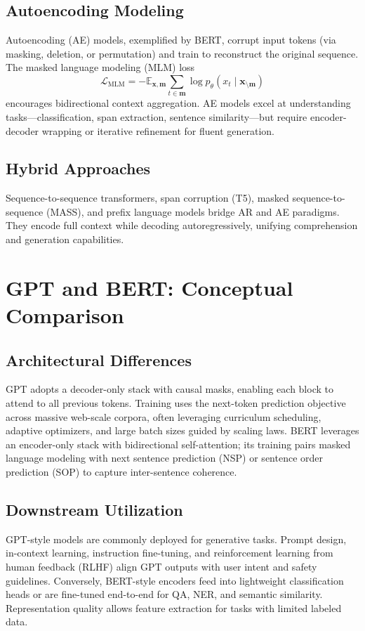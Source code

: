 \documentclass{article}
\begin{document}
\subsection{Autoencoding Modeling}
Autoencoding (AE) models, exemplified by BERT, corrupt input tokens (via masking, deletion, or permutation) and train to reconstruct the original sequence. The masked language modeling (MLM) loss
\begin{equation}
  \mathcal{L}_{\text{MLM}} = - \mathbb{E}_{\mathbf{x}, \mathbf{m}} \sum_{t \in \mathbf{m}} \log p_{\theta}(x_t \mid \mathbf{x}_{\setminus \mathbf{m}})
\end{equation}
encourages bidirectional context aggregation. AE models excel at understanding tasks—classification, span extraction, sentence similarity—but require encoder-decoder wrapping or iterative refinement for fluent generation.

\subsection{Hybrid Approaches}
Sequence-to-sequence transformers, span corruption (T5), masked sequence-to-sequence (MASS), and prefix language models bridge AR and AE paradigms. They encode full context while decoding autoregressively, unifying comprehension and generation capabilities.

\section{GPT and BERT: Conceptual Comparison}
\subsection{Architectural Differences}
GPT adopts a decoder-only stack with causal masks, enabling each block to attend to all previous tokens. Training uses the next-token prediction objective across massive web-scale corpora, often leveraging curriculum scheduling, adaptive optimizers, and large batch sizes guided by scaling laws. BERT leverages an encoder-only stack with bidirectional self-attention; its training pairs masked language modeling with next sentence prediction (NSP) or sentence order prediction (SOP) to capture inter-sentence coherence.

\subsection{Downstream Utilization}
GPT-style models are commonly deployed for generative tasks. Prompt design, in-context learning, instruction fine-tuning, and reinforcement learning from human feedback (RLHF) align GPT outputs with user intent and safety guidelines. Conversely, BERT-style encoders feed into lightweight classification heads or are fine-tuned end-to-end for QA, NER, and semantic similarity. Representation quality allows feature extraction for tasks with limited labeled data.
\end{document}
